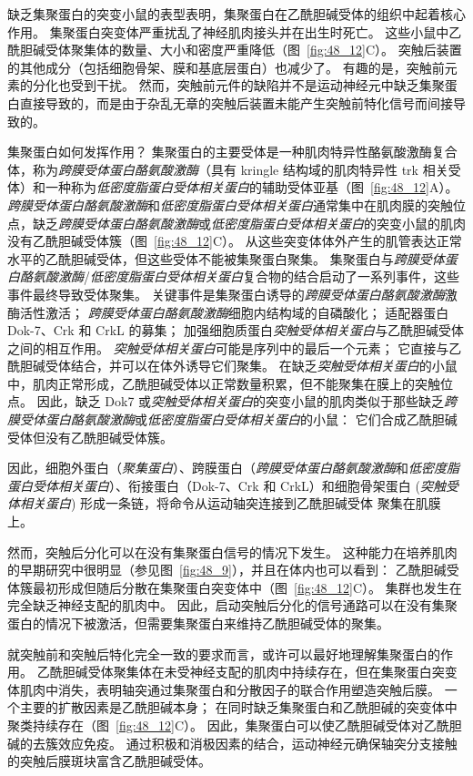 缺乏集聚蛋白的突变小鼠的表型表明，集聚蛋白在乙酰胆碱受体的组织中起着核心作用。
集聚蛋白突变体严重扰乱了神经肌肉接头并在出生时死亡。
这些小鼠中乙酰胆碱受体聚集体的数量、大小和密度严重降低（图~\ref{fig:48_12}C）。
突触后装置的其他成分（包括细胞骨架、膜和基底层蛋白）也减少了。
有趣的是，突触前元素的分化也受到干扰。
然而，突触前元件的缺陷并不是运动神经元中缺乏集聚蛋白直接导致的，而是由于杂乱无章的突触后装置未能产生突触前特化信号而间接导致的。


集聚蛋白如何发挥作用？
集聚蛋白的主要受体是一种肌肉特异性酪氨酸激酶复合体，称为\textit{跨膜受体蛋白酪氨酸激酶}（具有 kringle 结构域的肌肉特异性 trk 相关受体）和一种称为\textit{低密度脂蛋白受体相关蛋白}的辅助受体亚基（图~\ref{fig:48_12}A）。
\textit{跨膜受体蛋白酪氨酸激酶}和\textit{低密度脂蛋白受体相关蛋白}通常集中在肌肉膜的突触位点，缺乏\textit{跨膜受体蛋白酪氨酸激酶}或\textit{低密度脂蛋白受体相关蛋白}的突变小鼠的肌肉没有乙酰胆碱受体簇（图~\ref{fig:48_12}C）。
从这些突变体体外产生的肌管表达正常水平的乙酰胆碱受体，但这些受体不能被集聚蛋白聚集。
集聚蛋白与\textit{跨膜受体蛋白酪氨酸激酶}/\textit{低密度脂蛋白受体相关蛋白}复合物的结合启动了一系列事件，这些事件最终导致受体聚集。
关键事件是集聚蛋白诱导的\textit{跨膜受体蛋白酪氨酸激酶}激酶活性激活；
\textit{跨膜受体蛋白酪氨酸激酶}细胞内结构域的自磷酸化；
适配器蛋白 Dok-7、Crk 和 CrkL 的募集；
加强细胞质蛋白\textit{突触受体相关蛋白}与乙酰胆碱受体之间的相互作用。
\textit{突触受体相关蛋白}可能是序列中的最后一个元素；
它直接与乙酰胆碱受体结合，并可以在体外诱导它们聚集。
在缺乏\textit{突触受体相关蛋白}的小鼠中，肌肉正常形成，乙酰胆碱受体以正常数量积累，但不能聚集在膜上的突触位点。
因此，缺乏 Dok7 或\textit{突触受体相关蛋白}的突变小鼠的肌肉类似于那些缺乏\textit{跨膜受体蛋白酪氨酸激酶}或\textit{低密度脂蛋白受体相关蛋白}的小鼠：
它们合成乙酰胆碱受体但没有乙酰胆碱受体簇。


因此，细胞外蛋白（\textit{聚集蛋白}）、跨膜蛋白（\textit{跨膜受体蛋白酪氨酸激酶}和\textit{低密度脂蛋白受体相关蛋白}）、衔接蛋白（Dok-7、Crk 和 CrkL）和细胞骨架蛋白 (\textit{突触受体相关蛋白}) 形成一条链，将命令从运动轴突连接到乙酰胆碱受体 聚集在肌膜上。


然而，突触后分化可以在没有集聚蛋白信号的情况下发生。
这种能力在培养肌肉的早期研究中很明显（参见图~\ref{fig:48_9}），并且在体内也可以看到：
乙酰胆碱受体簇最初形成但随后分散在集聚蛋白突变体中（图~\ref{fig:48_12}C）。
集群也发生在完全缺乏神经支配的肌肉中。
因此，启动突触后分化的信号通路可以在没有集聚蛋白的情况下被激活，但需要集聚蛋白来维持乙酰胆碱受体的聚集。


就突触前和突触后特化完全一致的要求而言，或许可以最好地理解集聚蛋白的作用。
乙酰胆碱受体聚集体在未受神经支配的肌肉中持续存在，但在集聚蛋白突变体肌肉中消失，表明轴突通过集聚蛋白和分散因子的联合作用塑造突触后膜。
一个主要的扩散因素是乙酰胆碱本身；
在同时缺乏集聚蛋白和乙酰胆碱的突变体中聚类持续存在（图~\ref{fig:48_12}C）。
因此，集聚蛋白可以使乙酰胆碱受体对乙酰胆碱的去簇效应免疫。
通过积极和消极因素的结合，运动神经元确保轴突分支接触的突触后膜斑块富含乙酰胆碱受体。



